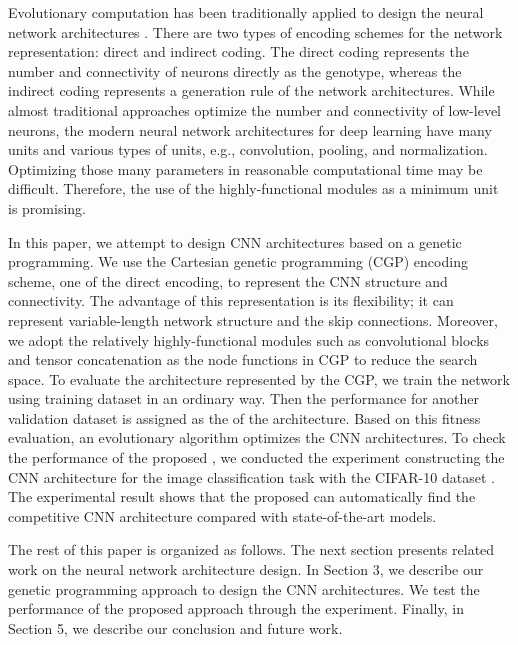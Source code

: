 Evolutionary computation has been traditionally applied to design the neural network architectures .
There are two types of encoding schemes for the network representation: direct and indirect coding.
The direct coding represents the number and connectivity of neurons directly as the genotype, whereas the indirect coding represents a generation rule of the network architectures.
While almost traditional approaches optimize the number and connectivity of low-level neurons, the modern neural network architectures for deep learning have many units and various types of units, e.g., convolution, pooling, and normalization.
Optimizing those many parameters in reasonable computational time may be difficult.
Therefore, the use of the highly-functional modules as a minimum unit is promising.

In this paper, we attempt to design CNN architectures based on a genetic programming.
We use the Cartesian genetic programming (CGP) \cite{miller_cartesian_2000,harding_evolution_2008,Miller2006} encoding scheme, one of the direct encoding, to represent the CNN structure and connectivity.
The advantage of this representation is its flexibility; it can represent variable-length network structure and the skip connections.
Moreover, we adopt the relatively highly-functional modules such as convolutional blocks and tensor concatenation as the node functions in CGP to reduce the search space.
To evaluate the architecture represented by the CGP, we train the network using training dataset in an ordinary way. Then the performance for another validation dataset is assigned as the  of the architecture. Based on this fitness evaluation, an evolutionary algorithm optimizes the CNN architectures.
 To check the performance of the proposed , we conducted the experiment constructing the CNN architecture for the image classification task with the CIFAR-10 dataset \cite{krizhevsky_learning_2009}. The experimental result shows that the proposed  can automatically find the competitive CNN architecture compared with state-of-the-art models.

The rest of this paper is organized as follows. The next section presents related work on the neural network architecture design. In Section 3, we describe our genetic programming approach to design the CNN architectures. We test the performance of the proposed approach through the experiment. Finally, in Section 5, we describe our conclusion and future work.


